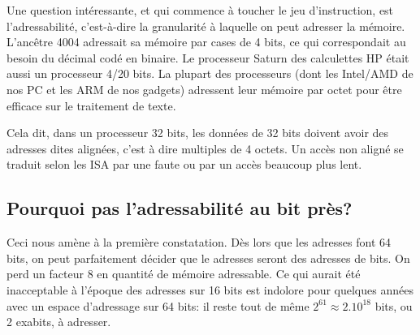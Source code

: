 \documentclass[architecture]{compas2018}
\begin{document}
\iffalse %
La croissance du bus de données a suivi avec du retard, pour plusieurs raisons.
La première est que la loi de Moore doit aussi fournir assez de transistors au processeur pour calculer sur des données de plus en plus grandes.
Mais la complexité des principales opérations d'un processeur travaillant sur $n$ bits est en $n$, en $n\log n$ ou au pire en $n^2$: si l'on a pu être à l'étroit jusque dans les années 90 pour construire un processeur qui peut calculer sur des adresses mémoires, ce n'est plus le cas depuis.
La seconde raison est que les ordinateurs servent beaucoup à travailler sur du texte, donc des octets.
On a donc vu des processeurs très populaires 8/16 bits, c'est à dire $w_d=8$ et  $w_a = 16$: les z80, 6502, 8088; des processeurs 16/32 bits (68000, 80286 à 486); et même une variante 8/32 bits, le 68008. Puis l'industrie a convergé vers 32/32 avec l'arrivée des processeurs RISC  (SPARC,  ARM et Power)  puis et 64/64 avec AMD64 et ARM64.
Ainsi,  
De nos jours, les processeurs ont des registres de plusieurs centaines de bits (AMD64 SSE* puis AVX*, ARM Neon), encore une fois parce que la loi de Moore le permet.
Mais ces registres sont des vecteurs de données d'au plus 64 bits.
\fi



Une question intéressante, et qui commence à toucher le jeu d'instruction, est l'adressabilité, c'est-à-dire la granularité à laquelle on peut adresser la mémoire.
L'ancêtre 4004 adressait sa mémoire par cases de 4 bits, ce qui correspondait au besoin du décimal codé en binaire. Le processeur Saturn des calculettes HP était aussi un processeur 4/20 bits.
La plupart des processeurs (dont les Intel/AMD de nos PC et les ARM de nos gadgets) adressent leur mémoire par octet pour être efficace sur le traitement de texte.

Cela dit, dans un processeur 32 bits, les données de 32 bits doivent avoir des adresses dites alignées, c'est à dire multiples de 4 octets. Un accès non aligné se traduit selon les ISA par une faute ou par un accès beaucoup plus lent.


\subsection{Pourquoi pas l'adressabilité au bit près?}
Ceci nous amène à la première constatation. Dès lors que les adresses font 64 bits, on peut parfaitement décider  que le adresses seront des adresses de bits.
On perd un facteur 8 en quantité de mémoire adressable.
Ce qui aurait été inacceptable à l'époque des adresses sur 16 bits est indolore pour quelques années avec un espace d'adressage sur 64 bits: il reste tout de même $2^{61}\approx 2.10^{18}$ bits, ou 2 exabits, à adresser.
\end{document}
